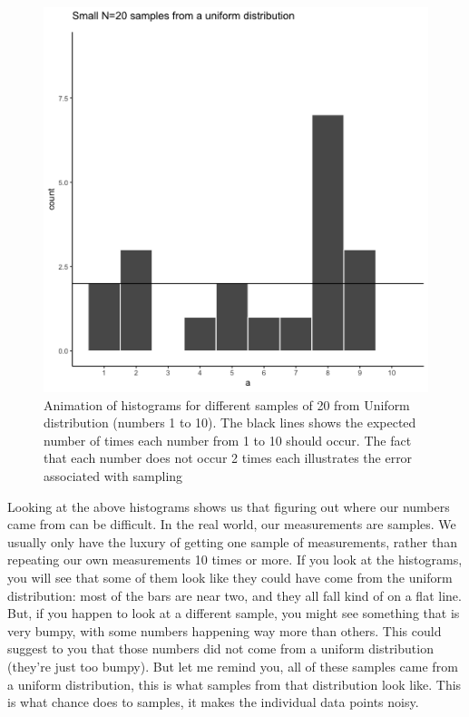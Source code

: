 \documentclass[
]{book}
\begin{document}
\begin{figure}
\centering
\includegraphics{gifs/sampleUnifExpected-1.gif}
\caption{\label{fig:5expectedUnif}Animation of histograms for different samples of 20 from Uniform distribution (numbers 1 to 10). The black lines shows the expected number of times each number from 1 to 10 should occur. The fact that each number does not occur 2 times each illustrates the error associated with sampling}
\end{figure}

Looking at the above histograms shows us that figuring out where our numbers came from can be difficult. In the real world, our measurements are samples. We usually only have the luxury of getting one sample of measurements, rather than repeating our own measurements 10 times or more. If you look at the histograms, you will see that some of them look like they could have come from the uniform distribution: most of the bars are near two, and they all fall kind of on a flat line. But, if you happen to look at a different sample, you might see something that is very bumpy, with some numbers happening way more than others. This could suggest to you that those numbers did not come from a uniform distribution (they're just too bumpy). But let me remind you, all of these samples came from a uniform distribution, this is what samples from that distribution look like. This is what chance does to samples, it makes the individual data points noisy.
\end{document}
